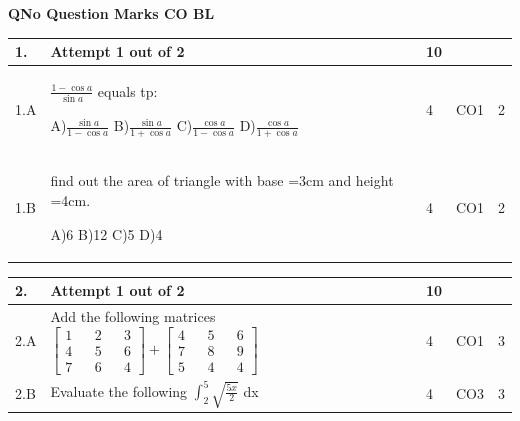 \documentclass[12pt]{article}
\begin{document}
	\begin{flushleft}
	\bf{QNo}\hspace{1.2cm} \bf{Question} \hspace{5.5cm}  \bf{Marks} \hspace{0.2cm} \bf{CO} \hspace{0.2cm}	\bf{BL}	
	
\end{flushleft} 
	\begin{longtable}{|L{1cm}|L{8cm}|C{1cm}|C{1cm}|C{1cm}|}\hline
		\bf{1}. & \bf{Attempt} \bf1 \bf{out} of \bf2 & \bf10  & & \\ \hline
				1.A & $\frac{1-\cos a}{\sin a}$  equals tp: \newline
					
		A)$\frac{\sin a}{1-\cos a}$\newline
		B)$\frac{\sin a}{1+\cos a}$\newline
		C)$\frac{\cos a}{1-\cos a}$\newline
		D)$\frac{\cos a}{1+\cos a}$ &
		4 &
		CO1&
		2 \\ \hline
		
				1.B & find out the area of triangle with base =3cm and height =4cm. \newline
					
		A)6\newline
		B)12\newline
		C)5\newline
		D)4 &
		4 &
		CO1&
		2 \\ \hline
		
		
	\end{longtable}

	\begin{longtable}{|L{1cm}|L{8cm}|C{1cm}|C{1cm}|C{1cm}|}\hline
	\bf2. & \bf{Attempt} \bf{1} \bf{out of} \bf{2} & \bf{10}  & & \\ \hline





		2.A &
	Add the following matrices $\begin{bmatrix} 1 && 2 && 3\\ 4 && 5 && 6\\ 7 && 6 && 4 \end{bmatrix}+\begin{bmatrix} 4 && 5 && 6\\ 7 && 8 && 9 \\ 5 && 4 && 4 \end{bmatrix}$ \newline
			
	 &  4 & CO1 & 3\\ \hline
		2.B &
	Evaluate the following $\int_{2}^{5}\sqrt{\frac{5x}{2}}$ dx \newline
			
	 &  4 & CO3 & 3\\ \hline
	\end{longtable}
\end{document}
